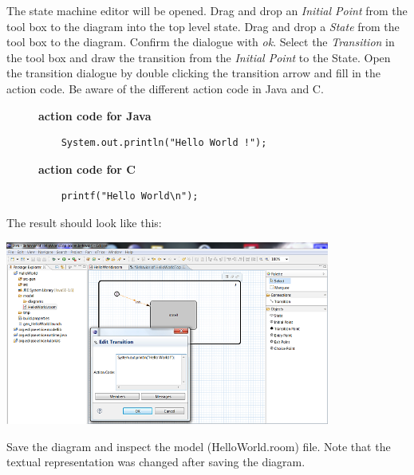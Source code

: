 The state machine editor will be opened. Drag and drop an \textit{Initial Point} from the tool box to the 
diagram into the top level state. Drag and drop a \textit{State} from the tool box to the diagram. Confirm the dialogue with \textit{ok}. Select the \textit{Transition} in the tool box and draw the transition from the \textit{Initial Point} to the State. Open the transition dialogue by double clicking the transition arrow and fill in the action code. Be aware of the different action code in Java and C.

\begin{figure}[ht]
\begin{minipage}[b]{0.45\linewidth}
	\begin{mdframed}
	\textbf{action code for Java}
	\begin{verbatim}
	System.out.println("Hello World !");
	\end{verbatim}
	\end{mdframed}
\end{minipage}
\hspace{0.5cm}
\begin{minipage}[b]{0.45\linewidth}
	\begin{mdframed}
	\textbf{action code for C}
	\begin{verbatim}
	printf("Hello World\n");
	\end{verbatim}
	\end{mdframed}
\end{minipage}
\end{figure}

 
The result should look like this:

\includegraphics[width=0.8\textwidth]{images/015-HelloWorld04.png}

Save the diagram and inspect the model (HelloWorld.room) file. Note that the textual representation was changed after saving 
the diagram.

